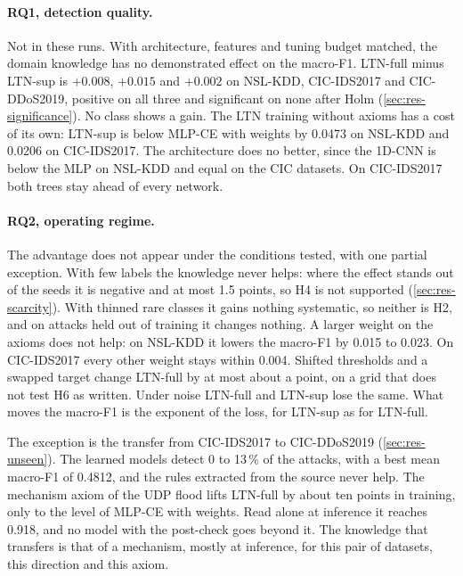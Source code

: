 \paragraph{RQ1, detection quality.}
Not in these runs. With architecture, features and tuning budget matched, the domain knowledge has
no demonstrated effect on the macro-F1. LTN-full minus LTN-sup is $+0.008$, $+0.015$ and $+0.002$ on
NSL-KDD, CIC-IDS2017 and CIC-DDoS2019, positive on all three and significant on none after Holm
(\cref{sec:res-significance}). No class shows a gain. The LTN training without axioms has a cost of
its own: LTN-sup is below MLP-CE with weights by 0.0473 on NSL-KDD and 0.0206 on CIC-IDS2017. The
architecture does no better, since the 1D-CNN is below the MLP on NSL-KDD and equal on the CIC
datasets. On CIC-IDS2017 both trees stay ahead of every network.

\paragraph{RQ2, operating regime.}
The advantage does not appear under the conditions tested, with one partial exception. With few
labels the knowledge never helps: where the effect stands out of the seeds it is negative and at
most 1.5 points, so H4 is not supported (\cref{sec:res-scarcity}). With thinned rare classes it
gains nothing systematic, so neither is H2, and on attacks held out of training it changes nothing.
A larger weight on the axioms does not help: on NSL-KDD it lowers the macro-F1 by 0.015 to 0.023.
On CIC-IDS2017 every other weight stays within 0.004. Shifted thresholds and a swapped target change LTN-full by at most
about a point, on a grid that does not test H6 as written. Under noise LTN-full and LTN-sup lose
the same. What moves the macro-F1 is the exponent of the loss, for LTN-sup as for LTN-full.

The exception is the transfer from CIC-IDS2017 to CIC-DDoS2019 (\cref{sec:res-unseen}). The learned
models detect 0 to 13\,\% of the attacks, with a best mean macro-F1 of 0.4812, and the rules extracted
from the source never help. The mechanism axiom of the UDP flood lifts LTN-full by about ten points
in training, only to the level of MLP-CE with weights. Read alone at inference it reaches 0.918, and
no model with the post-check goes beyond it. The knowledge that transfers is that of a mechanism,
mostly at inference, for this pair of datasets, this direction and this axiom.

